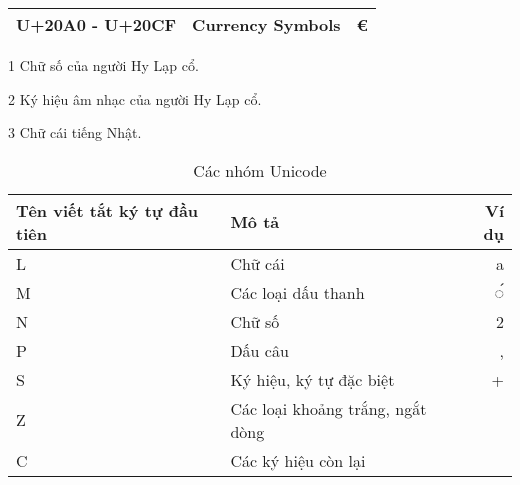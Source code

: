 \begin{table}[htb]
\begin{threeparttable}
\begin{tabular}{llr}
            U+20A0 - U+20CF   & Currency Symbols                        & €              \\
            \bottomrule
        \end{tabular}
        \begin{tablenotes}
            \item [1] Chữ số của người Hy Lạp cổ.
            \item [2] Ký hiệu âm nhạc của người Hy Lạp cổ.
            \item [3] Chữ cái tiếng Nhật.
        \end{tablenotes}
    \end{threeparttable}
\end{table}

\begin{table}[htb]
    \centering
    \caption{Các nhóm Unicode}
    \label{table:unicode-categories}
    \begin{tabular}{llr}
        \toprule
        \textbf{Tên viết tắt ký tự đầu tiên} & \textbf{Mô tả}                   & \textbf{Ví dụ} \\\midrule
        L                                    & Chữ cái                          & a              \\
        M                                    & Các loại dấu thanh               & ◌́              \\
        N                                    & Chữ số                           & 2              \\
        P                                    & Dấu câu                          & ,              \\
        S                                    & Ký hiệu, ký tự đặc biệt          & +              \\
        Z                                    & Các loại khoảng trắng, ngắt dòng &                \\
        C                                    & Các ký hiệu còn lại              &                \\
        \bottomrule
    \end{tabular}
\end{table}
